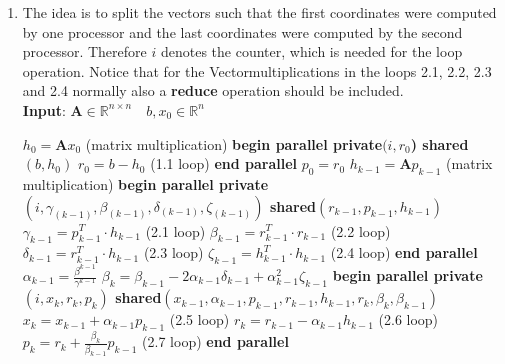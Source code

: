 \documentclass{article}
\begin{document}
\begin{enumerate}[label=(\alph*)]
  \item 
  The idea is to split the vectors such that the first coordinates were computed by one processor and the last coordinates were computed by the second processor. Therefore $i$ denotes the counter, which is needed for the loop operation. Notice that for the Vectormultiplications in the loops 2.1, 2.2, 2.3 and 2.4 normally also a \textbf{reduce} operation should be included.
  \\
  \textbf{Input}: $ \textbf{A} \in \mathbb{R}^{n\times n} \quad b, x_0\in \mathbb{R}^n$
    \begin{algorithmic}[1]
	\State $h_{0} = \textbf{A}x_{0}$ (matrix multiplication)
	\State \textbf{begin parallel private$(i, r_{0}$) shared$(b, h_{0})$}
	\State $r_0 = b - h_0$ (1.1 loop)
	\State \textbf{end parallel}
	\State $p_0 = r_0$
	\State $h_{k-1} = \textbf{A}p_{k-1}$ (matrix multiplication)
	\State \textbf{begin parallel private$(i, \gamma_{(k-1)}, \beta_{(k-1)}, \delta_{(k-1)}, \zeta_{(k-1)})$ shared$(r_{k-1},p_{k-1},h_{k-1})$}
	\State $\gamma_{k-1} = p^{T}_{k-1}\cdot h_{k-1}$ (2.1 loop)
	\State $\beta_{k-1} = r^{T}_{k-1}\cdot r_{k-1}$ (2.2 loop)
	\State $\delta_{k-1} = r^{T}_{k-1}\cdot h_{k-1}$ (2.3 loop)
	\State $\zeta_{k-1} = h^{T}_{k-1}\cdot h_{k-1}$ (2.4 loop)
	\State \textbf{end parallel}
	\State $\alpha_{k-1} = \frac{\beta^{k-1}}{\gamma^{k-1}}$
	\State $\beta_{k} = \beta_{k-1} - 2 \alpha_{k-1} \delta_{k-1} + \alpha_{k-1}^2\zeta_{k-1}$
	\State \textbf{begin parallel private$(i, x_{k}, r_{k}, p_{k})$ shared$(x_{k-1}, \alpha_{k-1}, p_{k-1}, r_{k-1}, h_{k-1},  r_{k},  \beta_{k}, \beta_{k-1})$}
	\State $x_k = x_{k-1} + \alpha_{k-1}p_{k-1}$ (2.5 loop)
	\State $r_k = r_{k-1} - \alpha_{k-1}h_{k-1}$ (2.6 loop)
	\State $p_k = r_{k} + \frac{\beta_k}{\beta_{k-1}}p_{k-1}$ (2.7 loop)
 	\State \textbf{end parallel}
	\EndFor
    \end{algorithmic}



\end{enumerate}
\end{document}
